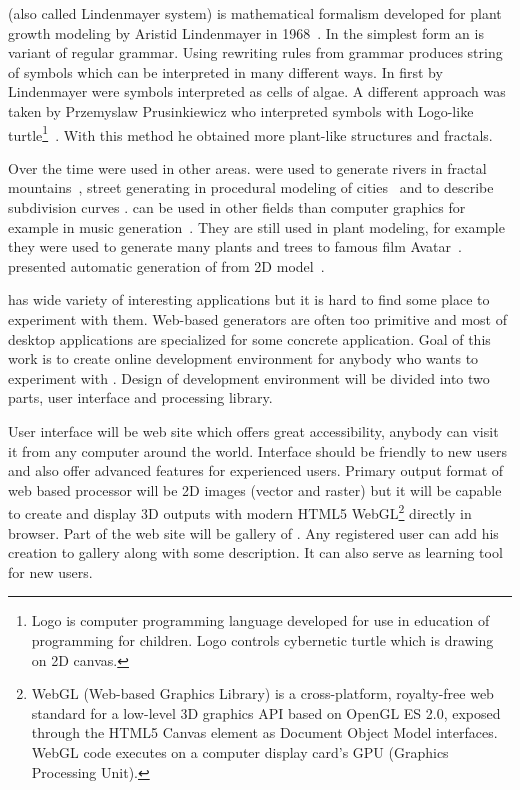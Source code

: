 

\lsystem (also called Lindenmayer system) is mathematical formalism developed for plant growth modeling by Aristid Lindenmayer in 1968~\cite{Lin68}.
In the simplest form an \lsystem is variant of regular grammar.
Using rewriting rules from grammar \lsystem produces string of symbols which can be interpreted in many different ways.
In first \lsystems by Lindenmayer were symbols interpreted as cells of algae.
A different approach was taken by Przemyslaw Prusinkiewicz who interpreted \lsystem symbols with Logo-like turtle\footnote{
	Logo is computer programming language developed for use in education of programming for children.
	Logo controls cybernetic turtle which is drawing on 2D canvas.}~\cite{Pru85}.
With this method he obtained more plant-like structures and fractals.~\cite{CD93}

Over the time \lsystems were used in other areas.
\lsystems were used to generate rivers in fractal mountains~\cite{PH93}, street generating in procedural modeling of cities~\cite{PM01} and to describe subdivision curves \cite{PSSK03}.
\lsystems can be used in other fields than computer graphics for example in music generation~\cite{HCJ99, Man06}.
They are still used in plant modeling, for example they were used to generate many plants and trees to famous film Avatar~\cite{Wor08, Dun10}.
\citeauthor{SBM10} presented automatic generation of \lsystems from 2D model~\cite{SBM10}.

\lsystems has wide variety of interesting applications but it is hard to find some place to experiment with them.
Web-based \lsystem generators are often too primitive and most of desktop applications are specialized for some concrete \lsystem application.
Goal of this work is to create online development environment for anybody who wants to experiment with \lsystems.
Design of development environment will be divided into two parts, user interface and \lsystem processing library.

User interface will be web site which offers great accessibility, anybody can visit it from any computer around the world.
Interface should be friendly to new users and also offer advanced features for experienced users.
Primary output format of web based \lsystem processor will be 2D images (vector and raster) but it will be capable to create and display 3D outputs with modern HTML5 WebGL\footnote{
	WebGL (Web-based Graphics Library) is a cross-platform, royalty-free web standard for a low-level 3D graphics API based on OpenGL ES 2.0, exposed through the HTML5 Canvas element as Document Object Model interfaces.
	WebGL code executes on a computer display card's GPU (Graphics Processing Unit).} directly in browser.
Part of the web site will be gallery of \lsystems.
Any registered user can add his creation to gallery along with some description.
It can also serve as learning tool for new users.

